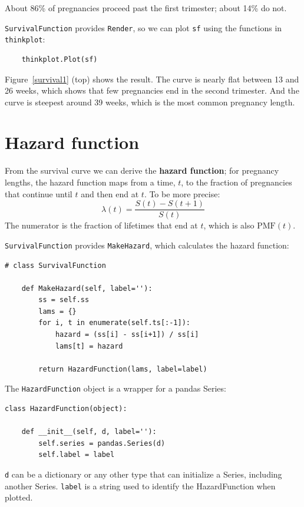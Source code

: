 \documentclass[12pt]{book}
\newcommand{\PMF}{\mathrm{PMF}}
\theoremstyle{exercise}
\begin{document}
About 86\% of pregnancies proceed past the first trimester;
about 14\% do not.

{\tt SurvivalFunction} provides {\tt Render}, so we can
plot {\tt sf} using the functions in {\tt thinkplot}:%

\begin{verbatim}
    thinkplot.Plot(sf)
\end{verbatim}

Figure~\ref{survival1} (top) shows the result.  The curve is nearly
flat between 13 and 26 weeks, which shows that few pregnancies
end in the second trimester.  And the curve is steepest around 39
weeks, which is the most common pregnancy length.%


\section{Hazard function}%
\label{hazard}

From the survival curve we can derive the {\bf hazard function};
for pregnancy lengths, the hazard function maps from a time, $t$, to
the fraction of pregnancies that continue until $t$ and then end at
$t$.  To be more precise:
%
\[ \lambda(t) = \frac{S(t) - S(t+1)}{S(t)} \]
%
The numerator is the fraction of lifetimes that end at $t$, which
is also $\PMF(t)$.%

{\tt SurvivalFunction} provides {\tt MakeHazard}, which calculates
the hazard function:

\begin{verbatim}
# class SurvivalFunction

    def MakeHazard(self, label=''):
        ss = self.ss
        lams = {}
        for i, t in enumerate(self.ts[:-1]):
            hazard = (ss[i] - ss[i+1]) / ss[i]
            lams[t] = hazard

        return HazardFunction(lams, label=label)
\end{verbatim}

The {\tt HazardFunction} object is a wrapper for a pandas
Series:%
%
%

\begin{verbatim}
class HazardFunction(object):

    def __init__(self, d, label=''):
        self.series = pandas.Series(d)
        self.label = label
\end{verbatim}

{\tt d} can be a dictionary or any other type that can initialize
a Series, including another Series.  {\tt label} is a string used
to identify the HazardFunction when plotted.%
\end{document}
